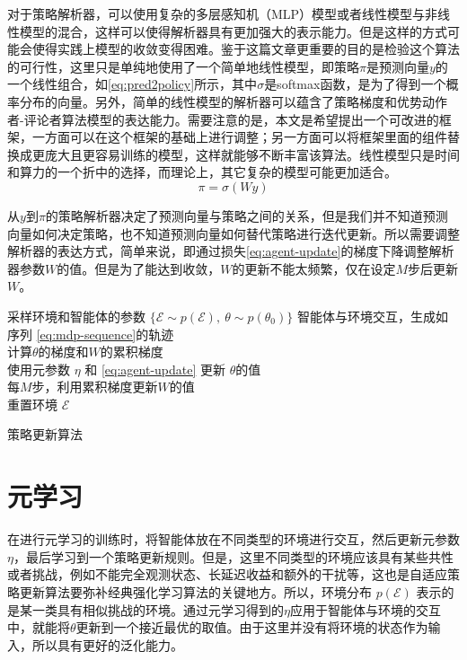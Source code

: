 对于策略解析器，可以使用复杂的多层感知机（MLP）模型或者线性模型与非线性模型的混合，这样可以使得解析器具有更加强大的表示能力。但是这样的方式可能会使得实践上模型的收敛变得困难。鉴于这篇文章更重要的目的是检验这个算法的可行性，这里只是单纯地使用了一个简单地线性模型，即策略$\pi$是预测向量$y$的一个线性组合，如\autoref{eq:pred2policy}所示，其中$\sigma$是softmax函数，是为了得到一个概率分布的向量。另外，简单的线性模型的解析器可以蕴含了策略梯度和优势动作者-评论者算法模型的表达能力。需要注意的是，本文是希望提出一个可改进的框架，一方面可以在这个框架的基础上进行调整；另一方面可以将框架里面的组件替换成更庞大且更容易训练的模型，这样就能够不断丰富该算法。线性模型只是时间和算力的一个折中的选择，而理论上，其它复杂的模型可能更加适合。
\begin{equation}
    \pi = \sigma (Wy)
    \label{eq:pred2policy}
\end{equation}

从$y$到$\pi$的策略解析器决定了预测向量与策略之间的关系，但是我们并不知道预测向量如何决定策略，也不知道预测向量如何替代策略进行迭代更新。所以需要调整解析器的表达方式，简单来说，即通过损失\autoref{eq:agent-update}的梯度下降调整解析器参数$W$的值。但是为了能达到收敛，$W$的更新不能太频繁，仅在设定$M$步后更新$W$。

\begin{algorithm}[h]
    采样环境和智能体的参数 $\{ \mathcal{E} \sim p(\mathcal{E}), \ \theta \sim p(\theta_0)\}$
     {
        智能体与环境交互，生成如序列 \ref{eq:mdp-sequence}的轨迹 \\
        计算$\theta$的梯度和$W$的累积梯度\\
        使用元参数 $\eta$ 和 \autoref{eq:agent-update} 更新 $\theta$的值 \\
        每$M$步，利用累积梯度更新$W$的值\\
         {
            重置环境 $\mathcal{E}$
        }
    }

    \caption{策略更新算法}
    \label{algo:policy-update}
\end{algorithm}



\section{元学习}

在进行元学习的训练时，将智能体放在不同类型的环境进行交互，然后更新元参数$\eta$，最后学习到一个策略更新规则。但是，这里不同类型的环境应该具有某些共性或者挑战，例如不能完全观测状态、长延迟收益和额外的干扰等，这也是自适应策略更新算法要弥补经典强化学习算法的关键地方。所以，环境分布 $p(\mathcal{E})$ 表示的是某一类具有相似挑战的环境。通过元学习得到的$\eta$应用于智能体与环境的交互中，就能将$\theta$更新到一个接近最优的取值。由于这里并没有将环境的状态作为输入，所以具有更好的泛化能力。

